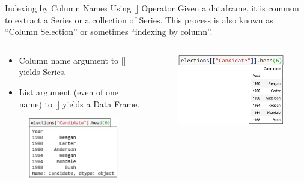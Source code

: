 \documentclass[aspectratio=169]{../latex_main/tntbeamer}  %
\begin{document}
	
	\begin{frame}{Indexing by Column Names Using [] Operator}
	       Given a dataframe, it is common to extract a Series or a collection of Series. This process is also known as “Column Selection” or sometimes “indexing by column”. 
	      \begin{columns}
	       
	        \begin{column}{.5\textwidth}
	            \begin{itemize}
	                \item Column name argument to [] yields Series.
	                \item List argument (even of one name) to [] yields a Data Frame.
	            \end{itemize}
	                  \begin{figure}
	                            \includegraphics[scale=.3]{Bild11}  
	                  \end{figure}
	        \end{column}
	        
	        
	        \begin{column}{.5\textwidth}
	                  \begin{figure}
	                            \includegraphics[scale=.3]{Bild13}  
	                  \end{figure}
	        \end{column}
	      \end{columns}
	\end{frame}
	
\end{document}
